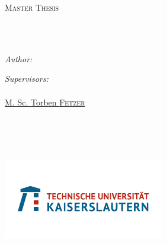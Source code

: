 \documentclass[
11pt, %
english, %
singlespacing, %
headsepline, %
]{MastersDoctoralThesis} %
\author{Jingyuan  \textsc{Sha}} %
\begin{document}
\frontmatter %

\pagestyle{plain} %


\begin{titlepage}
\begin{center}
\vspace*{.06\textheight}
{\scshape\LARGE \univname\par}\vspace{1.5cm} %
\textsc{\Large Master Thesis}\\[0.5cm] %

\HRule \\[0.4cm] %
{\huge \bfseries \ttitle\par}\vspace{0.4cm} %
\HRule \\[1.5cm] %
 
\begin{minipage}[t]{0.4\textwidth}
\begin{flushleft} \large
\emph{Author:}\\
\href{https://linkedin.com/in/jingyuan-sha-5b8b43208}{\authorname} %
\end{flushleft}
\end{minipage}
\begin{minipage}[t]{0.4\textwidth}
\begin{flushright} \large
\emph{Supervisors:} \\
\href{https://av.dfki.de/members/stricker/}{\supname}\\
\href{https://av.dfki.de/members/fetzer/}{M. Sc. Torben \textsc{Fetzer}}
\end{flushright}
\end{minipage}\\[3cm]
 
\vfill


\groupname\\
\deptname\\ %
\includegraphics{Figures/TUK_LOGO_RGB}\\[2cm] %
 

\end{center}
\end{titlepage}
\end{document}
